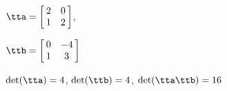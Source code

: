 {$\tta = \left[\hskip -3pt \begin{array}{cc} 2&0\\  1&2\end {array}\hskip -3pt \right] $, 

$\ttb = \left[\hskip -3pt \begin{array}{cc} 0&-4\\  1&3\end{array}\hskip -3pt \right] $}
{$\det(\tta)=4$, $\det(\ttb)=4$, $\det(\tta\ttb)=16$}






  

